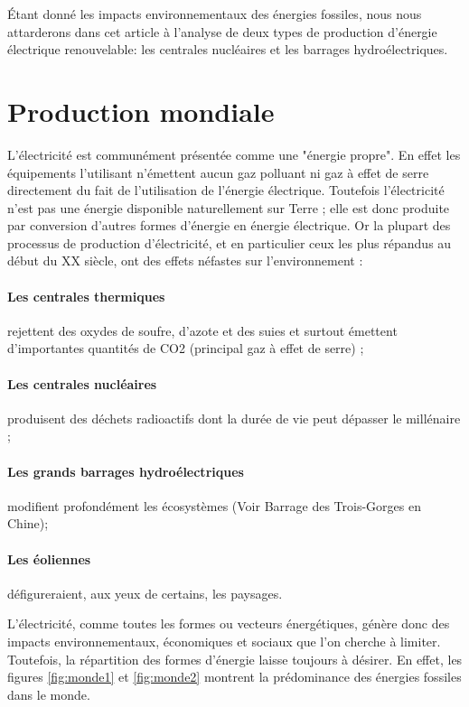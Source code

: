 \documentclass[12pt,a4paper,oneside,openany]{memoir}
\begin{document}
Étant donné les impacts environnementaux des énergies fossiles, nous nous attarderons dans cet article à l'analyse de deux types de production d'énergie électrique renouvelable: les centrales nucléaires et les barrages hydroélectriques. 

\section{Production mondiale}

L'électricité est communément présentée comme une "énergie propre". En effet les équipements l'utilisant n'émettent aucun gaz polluant ni gaz à effet de serre directement du fait de l'utilisation de l'énergie électrique.
Toutefois l'électricité n'est pas une énergie disponible naturellement sur Terre ; elle est donc produite par conversion d'autres formes d'énergie en énergie électrique.
Or la plupart des processus de production d'électricité, et en particulier ceux les plus répandus au début du XX\ieme{} siècle, ont des effets néfastes sur l'environnement :


\paragraph{Les centrales thermiques} rejettent des oxydes de soufre, d'azote et des suies et surtout émettent d'importantes quantités de CO2 (principal gaz à effet de serre) ;
\paragraph{Les centrales nucléaires} produisent des déchets radioactifs dont la durée de vie peut dépasser le millénaire ;
\paragraph{Les grands barrages hydroélectriques}  modifient profondément les écosystèmes (Voir Barrage des Trois-Gorges en Chine);
\paragraph{Les éoliennes} défigureraient, aux yeux de certains, les paysages.


L'électricité, comme toutes les formes ou vecteurs énergétiques, génère donc des impacts environnementaux, économiques et sociaux que l'on cherche à limiter. Toutefois, la répartition des formes d'énergie laisse toujours à désirer. En effet, les figures \ref{fig:monde1} et \ref{fig:monde2} montrent la prédominance des énergies fossiles dans le monde.
\end{document}
